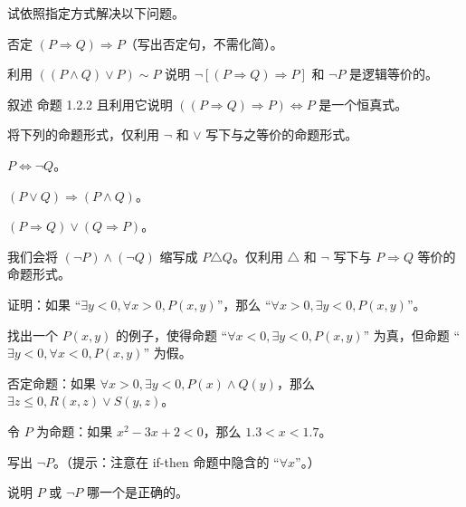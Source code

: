 \begin{problemset}
    \item 试依照指定方式解决以下问题。
    \begin{probenumerate}
        \item 否定 $(P \Rightarrow Q) \Rightarrow P$（写出否定句，不需化简）。
        \item 利用 $((P \wedge Q) \vee P) \sim P$ 说明 $\neg[(P \Rightarrow Q) \Rightarrow P]$ 和 $\neg P$ 是逻辑等价的。
        \item 叙述 命题 1.2.2 且利用它说明 $((P \Rightarrow Q) \Rightarrow P) \Leftrightarrow P$ 是一个恒真式。
    \end{probenumerate}

    \item 将下列的命题形式，仅利用 $\neg$ 和 $\vee$ 写下与之等价的命题形式。
    \begin{probenumerate}
        \item $P \Leftrightarrow \neg Q$。
        \item $(P \vee Q) \Rightarrow (P \wedge Q)$。
        \item $(P \Rightarrow Q) \vee (Q \Rightarrow P)$。
    \end{probenumerate}

    \item 我们会将 $(\neg P) \wedge (\neg Q)$ 缩写成 $P \triangle Q$。仅利用 $\triangle$ 和 $\neg$ 写下与 $P \Rightarrow Q$ 等价的命题形式。

    \item 证明：如果 “$\exists y < 0, \forall x > 0, P(x, y)$”，那么 “$\forall x > 0, \exists y < 0, P(x, y)$”。

    \item 找出一个 $P(x, y)$ 的例子，使得命题 “$\forall x < 0, \exists y < 0, P(x, y)$” 为真，但命题 “$\exists y < 0, \forall x < 0, P(x, y)$” 为假。

    \item 否定命题：如果 $\forall x > 0, \exists y < 0, P(x) \wedge Q(y)$，那么 $\exists z \leq 0, R(x, z) \vee S(y, z)$。

    \item 令 $P$ 为命题：如果 $x^2 - 3x + 2 < 0$，那么 $1.3 < x < 1.7$。
    \begin{probenumerate}
        \item 写出 $\neg P$。（提示：注意在 if-then 命题中隐含的 “$\forall x$”。）
        \item 说明 $P$ 或 $\neg P$ 哪一个是正确的。
    \end{probenumerate}
\end{problemset}
